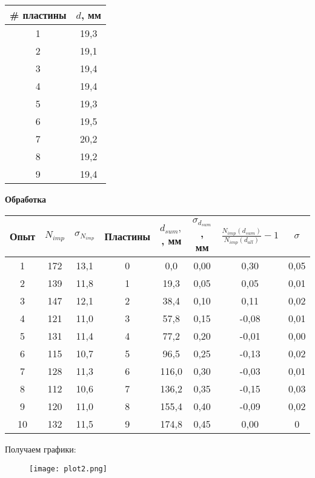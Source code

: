 \documentclass[12pt]{article}
\begin{document}
\begin{center}
    \begin{tabular}{|c|c|}
      \hline
      \# пластины & $d$, мм \\ \hline
      1 & 19,3 \\ \hline
      2 & 19,1 \\ \hline
      3 & 19,4 \\ \hline
      4 & 19,4 \\ \hline
      5 & 19,3 \\ \hline
      6 & 19,5 \\ \hline
      7 & 20,2 \\ \hline
      8 & 19,2 \\ \hline
      9 & 19,4 \\ \hline
   \end{tabular}
\end{center}
\begin{center}
    \textbf{Обработка}
\end{center}
\begin{center}
    \begin{tabular}{|c|c|c|c|c|c|c|c|}
      \hline
      Опыт & $N_{imp}$ & $\sigma_{N_{imp}}$ & Пластины & $d_{sum},$, мм & $\sigma_{d_{sum}}$, мм & $\displaystyle \frac{N_{imp}(d_{sum})}{N_{imp}(d_{all})} - 1$ & $\sigma$ \\ \hline
1 & 172 & 13,1 & 0 & 0,0 & 0,00 & 0,30 & 0,05  \\ \hline
2 & 139 & 11,8 & 1 & 19,3 & 0,05 & 0,05 & 0,01 \\ \hline
3 & 147 & 12,1 & 2 & 38,4 & 0,10 & 0,11 & 0,02  \\ \hline
4 & 121 & 11,0 & 3 & 57,8 & 0,15 & -0,08 & 0,01  \\ \hline
5 & 131 & 11,4 & 4 & 77,2 & 0,20 & -0,01 & 0,00  \\ \hline
6 & 115 & 10,7 & 5 & 96,5 & 0,25 & -0,13 & 0,02  \\ \hline
7 & 128 & 11,3 & 6 & 116,0 & 0,30 & -0,03 & 0,01  \\ \hline
8 & 112 & 10,6 & 7 & 136,2 & 0,35 & -0,15 & 0,03  \\ \hline
9 & 120 & 11,0 & 8 & 155,4 & 0,40 & -0,09 & 0,02  \\ \hline
10 & 132 & 11,5 & 9 & 174,8 & 0,45 & 0,00 & 0  \\ \hline
    \end{tabular}
\end{center}
Получаем графики:
\begin{figure}[ht]
    \centering
    \texttt{[image: plot2.png]}
    \label{fig:plot2}
\end{figure}
\end{document}
